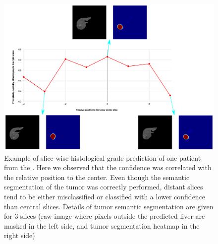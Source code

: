 \begin{figure}[th!]
\centering
\includegraphics[width=0.7\linewidth]{HistologicalGradePrediction/images/Slice_hist_grad_prediction_2}
\caption{Example of slice-wise histological grade prediction of one patient from the . Here we observed that the confidence was correlated with the relative position to the center. Even though the semantic segmentation of the tumor was correctly performed, distant slices tend to be either misclassified or classified with a lower confidence than central slices. Details of tumor semantic segmentation are given for 3 slices (raw image where pixels outside the predicted liver are masked in the left side, and tumor segmentation heatmap in the right side)}
\label{fig:Slice_hist_grad_prediction_2}
\end{figure}


